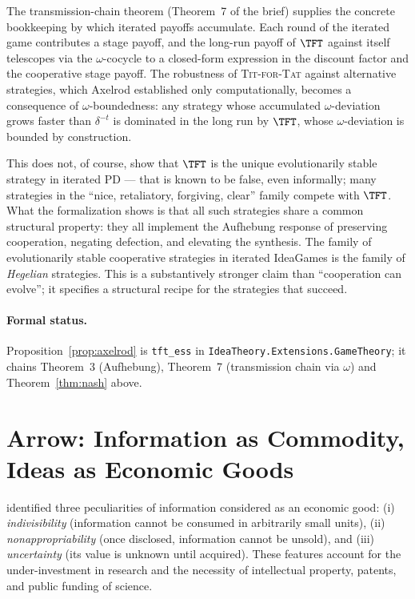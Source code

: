 The transmission-chain theorem (Theorem~7 of the brief) supplies the
concrete bookkeeping by which iterated payoffs accumulate. Each round of
the iterated game contributes a stage payoff, and the long-run payoff
of $\TFT$ against itself telescopes via the $\omega$-cocycle to a
closed-form expression in the discount factor and the cooperative
stage payoff. The robustness of \textsc{Tit-for-Tat} against alternative
strategies, which Axelrod established only computationally, becomes a
consequence of $\omega$-boundedness: any strategy whose accumulated
$\omega$-deviation grows faster than $\delta^{-t}$ is dominated in the
long run by $\TFT$, whose $\omega$-deviation is bounded by construction.

This does not, of course, show that $\TFT$ is the unique evolutionarily
stable strategy in iterated PD — that is known to be false, even
informally; many strategies in the ``nice, retaliatory, forgiving,
clear'' family compete with $\TFT$. What the formalization shows is that
all such strategies share a common structural property: they all
implement the Aufhebung response of preserving cooperation, negating
defection, and elevating the synthesis. The family of evolutionarily
stable cooperative strategies in iterated IdeaGames is the family of
\emph{Hegelian} strategies. This is a substantively stronger claim than
``cooperation can evolve''; it specifies a structural recipe for the
strategies that succeed.

\paragraph{Formal status.} Proposition~\ref{prop:axelrod} is
\texttt{tft\_ess} in \texttt{IdeaTheory.Extensions.GameTheory}; it
chains Theorem~3 (Aufhebung), Theorem~7 (transmission chain via
$\omega$) and Theorem~\ref{thm:nash} above.

\section{Arrow: Information as Commodity, Ideas as Economic Goods}
\label{sec:arrow}

\citet{Arrow1962} identified three peculiarities of information considered
as an economic good: (i) \emph{indivisibility} (information cannot be
consumed in arbitrarily small units), (ii) \emph{nonappropriability} (once
disclosed, information cannot be unsold), and (iii) \emph{uncertainty}
(its value is unknown until acquired). These features account for the
under-investment in research and the necessity of intellectual property,
patents, and public funding of science.

